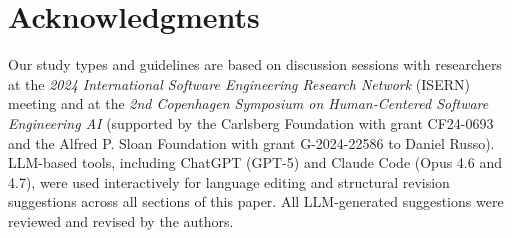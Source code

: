 \documentclass[smallextended]{svjour3}
\begin{document}
\section*{Acknowledgments}

Our study types and guidelines are based on discussion sessions with researchers at the \emph{2024 International Software Engineering Research Network} (ISERN) meeting and at the \emph{2nd Copenhagen Symposium on Human-Centered Software Engineering AI} (supported by the Carlsberg Foundation with grant CF24-0693 and the Alfred P. Sloan Foundation with grant G-2024-22586 to Daniel Russo).
LLM-based tools, including ChatGPT (GPT-5) and Claude Code (Opus 4.6 and 4.7), were used interactively for language editing and structural revision suggestions across all sections of this paper. All LLM-generated suggestions were reviewed and revised by the authors.
\end{document}

